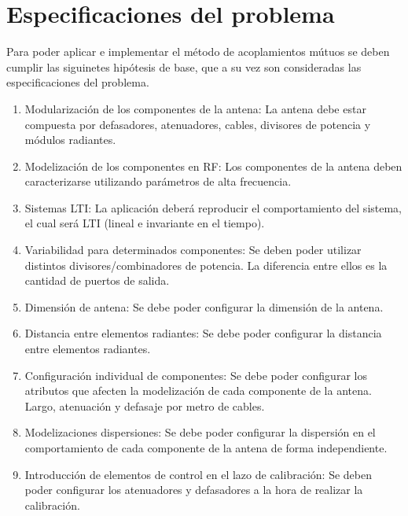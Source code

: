 \section{Especificaciones del problema}

Para poder aplicar e implementar el método de acoplamientos mútuos se deben cumplir las siguinetes hipótesis de base, que a su 
vez son consideradas las especificaciones del problema.


\begin{enumerate}
    \item Modularización de los componentes de la antena: La antena debe estar compuesta por defasadores, atenuadores, cables, 
		divisores de potencia y módulos radiantes.
    
	\item Modelización de los componentes en RF: Los componentes de la antena deben caracterizarse utilizando parámetros de alta 
		frecuencia.

    \item Sistemas LTI: La aplicación deberá reproducir el comportamiento del sistema, el cual será LTI (lineal e invariante 
		en el tiempo).
    
    \item Variabilidad para determinados componentes: Se deben poder utilizar distintos divisores/combinadores de potencia. 
		La diferencia entre ellos es la cantidad de puertos de salida.
    
    \item Dimensión de antena: Se debe poder configurar la dimensión de la antena.
    \item Distancia entre elementos radiantes: Se debe poder configurar la distancia entre elementos radiantes.
    \item Configuración individual de componentes: Se debe poder configurar los atributos que afecten la modelización de cada 
		componente de la antena. Largo, atenuación y defasaje por metro de cables. 
    
    \item Modelizaciones dispersiones: Se debe poder configurar la dispersión en el comportamiento de cada componente de la 
		antena de forma independiente.

    \item Introducción de elementos de control en el lazo de calibración: Se deben poder configurar los atenuadores y 
		defasadores a la hora de realizar la calibración. 


\end{enumerate}
